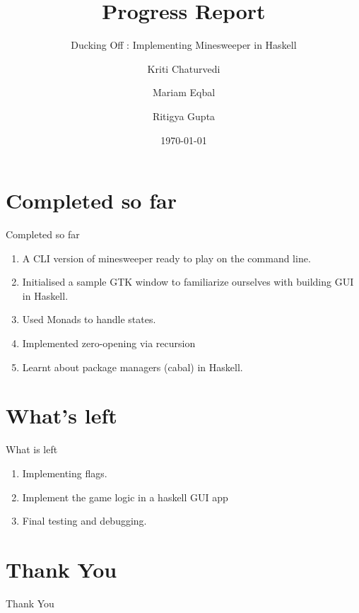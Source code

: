 \documentclass{beamer}
\title{Progress Report}
\subtitle{Ducking Off : Implementing Minesweeper in Haskell}
\author{Kriti Chaturvedi \and Mariam Eqbal \and Ritigya Gupta}
\date{\today}
\begin{document}
\begin{frame}
    \titlepage 
\end{frame}

\section{Completed so far}

\begin{frame}{Completed so far}
    \begin{enumerate}
        \item A CLI version of minesweeper ready to play on the command line.
        \item Initialised a sample GTK window to familiarize ourselves with building GUI in Haskell.
        \item Used Monads to handle states.
        \item Implemented zero-opening via recursion
        \item Learnt about package managers (cabal) in Haskell.
    \end{enumerate}
\end{frame}

\section{What's left}

\begin{frame}{What is left}
    \begin{enumerate}
        \item Implementing flags.
        \item Implement the game logic in a haskell GUI app
        \item Final testing and debugging.
    \end{enumerate}
\end{frame}

\section{Thank You}

\begin{frame}{ }
    \begin{center}
        \LARGE
        Thank You
    \end{center}
\end{frame}
\end{document}
